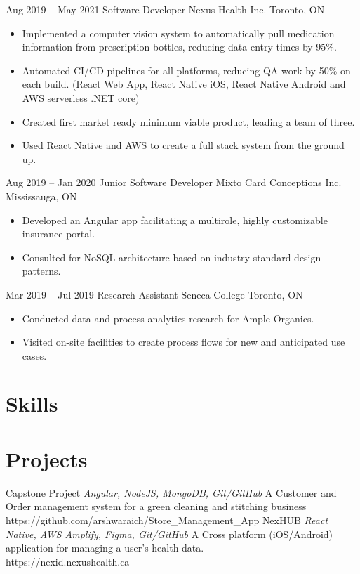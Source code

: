 \documentclass[letterpaper]{moderncv}
\begin{document}
\cventry
{Aug 2019 -- May 2021}
{Software Developer}
{Nexus Health Inc.}
{Toronto, ON}
{}
{\begin{itemize}%
    \item Implemented a computer vision system to automatically pull medication information from prescription bottles, reducing data entry times by 95\%.
    \item Automated CI/CD pipelines for all platforms, reducing QA work by 50\% on each build. (React Web App, React Native iOS, React Native Android and AWS serverless .NET core)
	\item Created first market ready minimum viable product, leading a team of three.
	\item Used React Native and AWS to create a full stack system from the ground up.
	\end{itemize}}
\cventry
{Aug 2019 -- Jan 2020}
{Junior Software Developer}
{Mixto Card Conceptions Inc.}
{Mississauga, ON}
{}
{\begin{itemize}%
	\item Developed an Angular app facilitating a multirole, highly customizable insurance portal.
	\item Consulted for NoSQL architecture based on industry standard design patterns.
	\end{itemize}}
\cventry
{Mar 2019 -- Jul 2019}
{Research Assistant}
{Seneca College}
{Toronto, ON}
{}
{\begin{itemize}%
	\item Conducted data and process analytics research for Ample Organics.
	\item Visited on-site facilities to create process flows for new and anticipated use cases.
	\end{itemize}}
\section{Skills}
\section{Projects}
\cventry
{}
{Capstone Project}
{}
{\textit{Angular, NodeJS, MongoDB, Git/GitHub}}
{}
{A Customer and Order management system for a green cleaning and stitching business\\https://github.com/arshwaraich/Store\_Management\_App}
\vspace{1mm}
\cventry
{}
{NexHUB}
{}
{\textit{React Native, AWS Amplify, Figma, Git/GitHub}}
{}
{A Cross platform (iOS/Android) application for managing a user's health data.\\https://nexid.nexushealth.ca}
\vspace{1mm}
\end{document}
